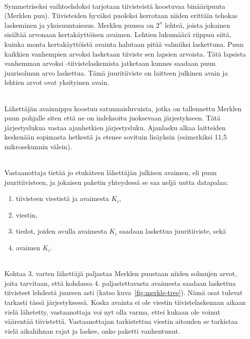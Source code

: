 \documentclass[finnish]{tktltiki2}
\theoremstyle{definition}
\theoremstyle{remark}
\begin{document}
\noindent \\
Symmetriseksi vaihtoehdoksi tarjotaan tiivisteistä koostuvaa binääripuuta (Merklen puu). Tiivisteiden hyväksi puoleksi kerrotaan niiden erittäin tehokas laskeminen ja yksisuuntaisuus. Merklen puussa on $2^n$ lehteä, joista jokainen sisältää arvonaan kertakäyttöisen avaimen. Lehtien lukumäärä riippuu siitä, kuinka monta kertakäyttöistä avainta halutaan pitää valmiiksi laskettuna. Puun kaikkien vanhempien arvoksi lasketaan tiiviste sen lapsien arvoista. Tätä lapsista vanhemman arvoksi -tiivistelaskemista jatketaan kunnes saadaan puun juurisolmun arvo laskettua. Tämä juuritiiviste on laitteen julkinen avain ja lehtien arvot ovat yksityinen avain.

\noindent \\
Lähettäjän avainnippu koostuu satunnaisluvuista, jotka on tallennettu Merklen puun pohjalle siten että ne on indeksoitu juoksevaan järjestykseen. Tätä järjestyslukua vastaa ajanhetkien järjestysluku. Ajanlasku alkaa laitteiden keskenään sopimasta hetkestä ja etenee sovituin lisäyksin (esimerkiksi 11,5 mikrosekunnin välein). 

\noindent \\
Vastaanottaja tietää jo etukäteen lähettäjän julkisen avaimen, eli puun juuritiivisteen, ja jokaisen paketin yhteydessä se saa neljä uutta datapalaa:

\begin{enumerate}
\item tiivisteen viestistä ja avaimesta $K_i$,
\item viestin,
\item tiedot, joiden avulla avaimesta $K_i$ saadaan laskettua juuritiiviste, sekä
\item avaimen $K_i$.
\end{enumerate}

\noindent \\
Kohtaa 3. varten lähettäjä paljastaa Merklen puustaan niiden solmujen arvot, joita tarvitaan, että kohdassa 4. paljastettavasta avaimesta saadaan laskettua tiivisteet lehdestä juureen asti (katso kuva~\ref{fig:merkle-tree}).
Nämä osat tulevat tarkasti tässä järjestyksessä. Koska avainta ei ole viestin tiivistelaskennan aikaan vielä lähetetty, vastaanottaja voi nyt olla varma, ettei kukaan ole voinut väärentää tiivistettä. Vastaanottajan tarkistettua viestin aitouden se tarkistaa vielä aikahihnan rajat ja laskee, onko paketti vanhentunut.
\end{document}
